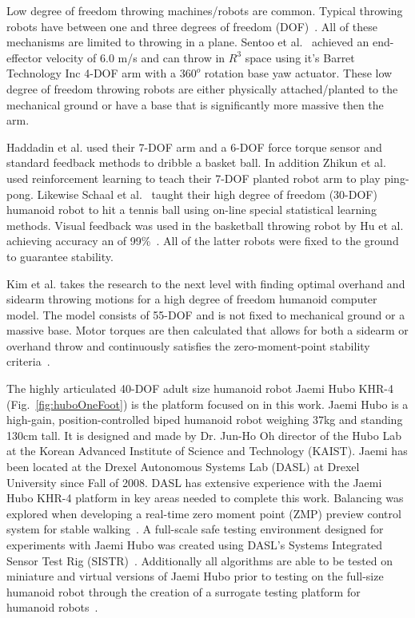 Low degree of freedom throwing machines/robots are common.  Typical throwing robots have between one and three degrees of freedom (DOF)~\cite{509405, Lynch97dynamicnonprehensile, 5152525, 509335, springerlink:10.1007/s10015-006-0401-0}.  All of these mechanisms are limited to throwing in a plane.   Sentoo et al.~\cite{4651142} achieved an end-effector velocity of 6.0 m/s and can throw in $R^3$ space using it's Barret Technology Inc 4-DOF arm with a $360^o$ rotation base yaw actuator.  These low degree of freedom throwing robots are either physically attached/planted to the mechanical ground or have a base that is significantly more massive then the arm.  

Haddadin et al.\cite{6094757} used their 7-DOF arm and a 6-DOF force torque sensor and standard feedback methods to dribble a basket ball.  In addition Zhikun et al.~\cite{6094892} used reinforcement learning to teach their 7-DOF planted robot arm to play ping-pong.  Likewise Schaal et al.~\cite{schaal01/BIRG} taught their high degree of freedom (30-DOF) humanoid robot to hit a tennis ball using on-line special statistical learning methods.  Visual feedback was used in the basketball throwing robot by Hu et al. achieving accuracy an of 99\%~\cite{5649335}.  All of the latter robots were fixed to the ground to guarantee stability.

Kim et al. \cite{5686315,JooH2011438} takes the research to the next level with finding optimal overhand and sidearm throwing motions for a high degree of freedom humanoid computer model.  The model consists of 55-DOF and is not fixed to mechanical ground or a massive base.  Motor torques are then calculated that allows for both a sidearm or overhand throw and continuously satisfies the zero-moment-point stability criteria~\cite{4309277}.  

The highly articulated 40-DOF adult size humanoid robot Jaemi Hubo KHR-4 (Fig.~\ref{fig:huboOneFoot}) is the platform focused on in this work.  Jaemi Hubo is a high-gain, position-controlled biped humanoid robot weighing 37kg and standing 130cm tall.  It is designed and made by Dr. Jun-Ho Oh director of the Hubo Lab at the Korean Advanced Institute of Science and Technology (KAIST).  Jaemi has been located at the Drexel Autonomous Systems Lab (DASL) at Drexel University since Fall of 2008.  DASL has extensive experience with the Jaemi Hubo KHR-4 platform in key areas needed to complete this work.  Balancing was explored when developing a real-time zero moment point (ZMP) preview control system for stable walking~\cite{5686276}.  A full-scale safe testing environment designed for experiments with Jaemi Hubo was created using DASL's Systems Integrated Sensor Test Rig (SISTR)~\cite{5686325}.  Additionally all algorithms are able to be tested on miniature and virtual versions of Jaemi Hubo prior to testing on the full-size humanoid robot through the creation of a surrogate testing platform for humanoid robots~\cite{5379582}.


